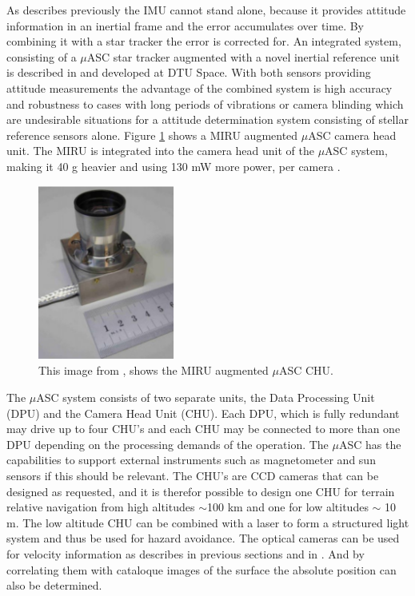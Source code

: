 As describes previously the IMU cannot stand alone, because it provides attitude information in an inertial frame and the error accumulates over time. By combining it with a star tracker the error is corrected for. An integrated system, consisting of a $\mu$ASC star tracker augmented with a novel inertial reference unit is described in \cite{Bjarno} and developed at DTU Space. With both sensors providing attitude measurements the advantage of the combined system is high accuracy and robustness to cases with long periods of vibrations or camera blinding which are undesirable situations for a attitude determination system consisting of stellar reference sensors alone. Figure \ref{miruasc} shows a MIRU augmented $\mu$ASC camera head unit. The MIRU is integrated into the camera head unit of the $\mu$ASC system, making it 40 g heavier and using 130 mW more power, per camera \cite{mirusheet}. 

\begin{figure}[htb]
\begin{center}
\includegraphics[width=0.4\textwidth]{figures/navtheory/chumiro}
\caption{This image from \cite{mirusheet}, shows the MIRU augmented $\mu$ASC CHU.}
\label{miruasc}
\end{center}
\end{figure}

The $\mu$ASC system consists of two separate units, the Data Processing Unit (DPU) and the Camera Head Unit (CHU). Each DPU, which is fully redundant may drive up to four CHU's and each CHU may be connected to more than one DPU depending on the processing demands of the operation. The $\mu$ASC has the capabilities to support external instruments such as magnetometer and sun sensors if this should be relevant. The CHU's are CCD cameras that can be designed as requested, and it is therefor possible to design one CHU for terrain relative navigation from high altitudes $\sim$100 km and one for low altitudes $\sim$ 10 m. The low altitude CHU can be combined with a laser to form a structured light system and thus be used for hazard avoidance. The optical cameras can be used for velocity information as describes in previous sections and in \cite{alessandro}. And by correlating them with cataloque images of the surface the absolute position can also be determined. \\

